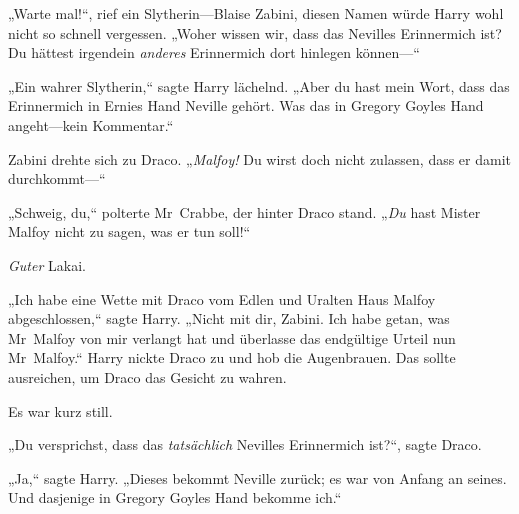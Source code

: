 „Warte mal!“, rief ein Slytherin—Blaise Zabini, diesen Namen würde Harry wohl nicht so schnell vergessen. „Woher wissen wir, dass das Nevilles Erinnermich ist? Du hättest irgendein \emph{anderes} Erinnermich dort hinlegen können—“

„Ein wahrer Slytherin,“ sagte Harry lächelnd. „Aber du hast mein Wort, dass das Erinnermich in Ernies Hand Neville gehört. Was das in Gregory Goyles Hand angeht—kein Kommentar.“

Zabini drehte sich zu Draco. „\emph{Malfoy!} Du wirst doch nicht zulassen, dass er damit durchkommt—“

„Schweig, du,“ polterte Mr~Crabbe, der hinter Draco stand. „\emph{Du} hast Mister Malfoy nicht zu sagen, was er tun soll!“

\emph{Guter} Lakai.

„Ich habe eine Wette mit Draco vom Edlen und Uralten Haus Malfoy abgeschlossen,“ sagte Harry. „Nicht mit dir, Zabini. Ich habe getan, was Mr~Malfoy von mir verlangt hat und überlasse das endgültige Urteil nun Mr~Malfoy.“ Harry nickte Draco zu und hob die Augenbrauen. Das sollte ausreichen, um Draco das Gesicht zu wahren.

Es war kurz still.

„Du versprichst, dass das \emph{tatsächlich} Nevilles Erinnermich ist?“, sagte Draco.

„Ja,“ sagte Harry. „Dieses bekommt Neville zurück; es war von Anfang an seines. Und dasjenige in Gregory Goyles Hand bekomme ich.“

